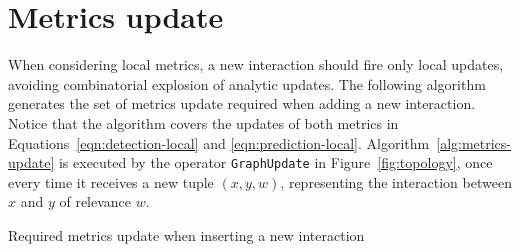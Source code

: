 \section{Metrics update}
\label{sec:metrics-update}

When considering local metrics, a new interaction should fire only local updates, avoiding combinatorial explosion of analytic updates.
The following algorithm generates the set of metrics update required when adding a new interaction.
Notice that the algorithm covers the updates of both metrics in Equations~\ref{eqn:detection-local} and \ref{eqn:prediction-local}. 
Algorithm~\ref{alg:metrics-update} is executed by the operator \texttt{GraphUpdate} in Figure~\ref{fig:topology}, once every time it receives a new tuple $(x,y,w)$, representing the interaction between $x$ and $y$ of relevance $w$.

\begin{algorithm}[t]
  
   {
  	




  }

  \caption{Required metrics update when inserting a new interaction}
  \label{alg:metrics-update}
\end{algorithm}

